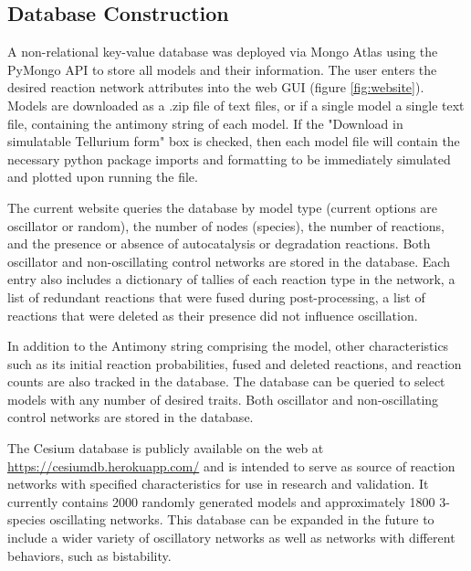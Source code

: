 \documentclass[12pt]{report}
\begin{document}
\subsection{Database Construction}
A non-relational key-value database was deployed via Mongo Atlas using the PyMongo API to store all models and their information. The user enters the desired reaction network attributes into the web GUI (figure \ref{fig:website}). Models are downloaded as a .zip file of text files, or if a single model a single text file, containing the antimony string of each model. If the "Download in simulatable Tellurium form" box is checked, then each model file will contain the necessary python package imports and formatting to be immediately simulated and plotted upon running the file.


The current website queries the database by model type (current options are oscillator or random), the number of nodes (species), the number of reactions, and the presence or absence of autocatalysis or degradation reactions. Both oscillator and non-oscillating control networks are stored in the database. Each entry also includes a dictionary of tallies of each reaction type in the network, a list of redundant reactions that were fused during post-processing, a list of reactions that were deleted as their presence did not influence oscillation. 




In addition to the Antimony string comprising the model, other characteristics such as its initial reaction probabilities, fused and deleted reactions, and reaction counts are also tracked in the database.  The database can be queried to select models with any number of desired traits. Both oscillator and non-oscillating control networks are stored in the database.

The Cesium database is publicly available on the web at \url{https://cesiumdb.herokuapp.com/} and is intended to serve as source of reaction networks with specified characteristics for use in research and validation.  It currently contains 2000 randomly generated models and approximately 1800 3-species oscillating networks. This database can be expanded in the future to include a wider variety of oscillatory networks as well as networks with different behaviors, such as bistability. 
\end{document}
